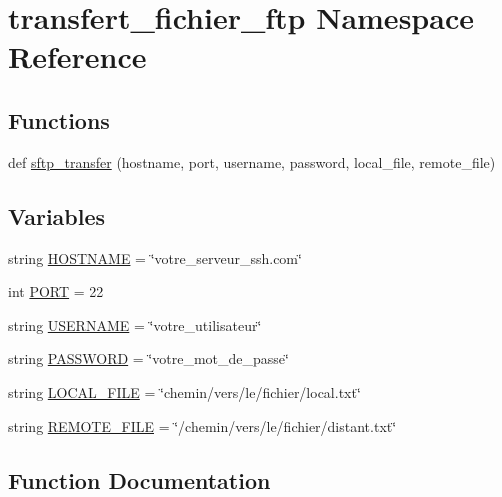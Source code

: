 \hypertarget{namespacetransfert__fichier__ftp}{}\section{transfert\+\_\+fichier\+\_\+ftp Namespace Reference}
\label{namespacetransfert__fichier__ftp}
\subsection*{Functions}
\begin{DoxyCompactItemize}
\item 
def \hyperlink{namespacetransfert__fichier__ftp_a6e6593409d5926a19cfd633ef9ac47ed}{sftp\+\_\+transfer} (hostname, port, username, password, local\+\_\+file, remote\+\_\+file)
\end{DoxyCompactItemize}
\subsection*{Variables}
\begin{DoxyCompactItemize}
\item 
string \hyperlink{namespacetransfert__fichier__ftp_aaf924bb1bce6dd4671118f7290805e75}{H\+O\+S\+T\+N\+A\+ME} = \char`\"{}votre\+\_\+serveur\+\_\+ssh.\+com\char`\"{}
\item 
int \hyperlink{namespacetransfert__fichier__ftp_a01f92a0bf115a21b4a583e882fee4da4}{P\+O\+RT} = 22
\item 
string \hyperlink{namespacetransfert__fichier__ftp_a0db1a1a4a8900ec50147d296ccd79b73}{U\+S\+E\+R\+N\+A\+ME} = \char`\"{}votre\+\_\+utilisateur\char`\"{}
\item 
string \hyperlink{namespacetransfert__fichier__ftp_a5abb8185f991a673b1c4487d397dbb36}{P\+A\+S\+S\+W\+O\+RD} = \char`\"{}votre\+\_\+mot\+\_\+de\+\_\+passe\char`\"{}
\item 
string \hyperlink{namespacetransfert__fichier__ftp_a706a5fc1828223a238c55e82ca7d184a}{L\+O\+C\+A\+L\+\_\+\+F\+I\+LE} = \char`\"{}chemin/vers/le/fichier/local.\+txt\char`\"{}
\item 
string \hyperlink{namespacetransfert__fichier__ftp_a3a3651c0269c79cff24af695b08d27f9}{R\+E\+M\+O\+T\+E\+\_\+\+F\+I\+LE} = \char`\"{}/chemin/vers/le/fichier/distant.\+txt\char`\"{}
\end{DoxyCompactItemize}


\subsection{Function Documentation}
\mbox{\label{namespacetransfert__fichier__ftp_a6e6593409d5926a19cfd633ef9ac47ed}} 
